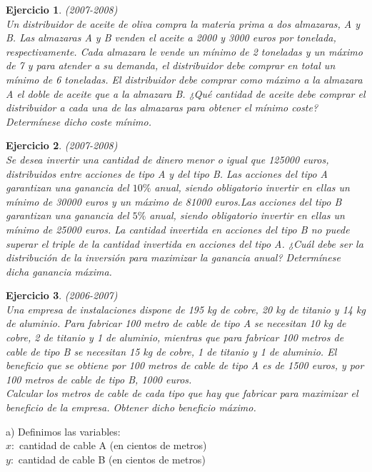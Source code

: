 \documentclass[12pt, a4paper]{amsart}
\newtheorem{ejer}{Ejercicio}
\newcommand{\s}{\color[rgb]{0,0,0.5}}
\begin{document}
\begin{ejer}\em  (2007-2008)\\
Un distribuidor de aceite de oliva compra la materia prima a dos almazaras, A y B. Las almazaras A y B venden el aceite a 2000 y 3000 euros por tonelada, respectivamente. Cada almazara le vende un mínimo de 2 toneladas y un máximo de 7 y para atender a su demanda, el distribuidor debe comprar en total un mínimo de 6 toneladas. El distribuidor debe comprar como máximo a la almazara A el doble de aceite que a la almazara B. ¿Qué cantidad de aceite debe comprar el distribuidor a cada una de las almazaras para obtener el mínimo coste? Determínese dicho coste mínimo.
\end{ejer}

\begin{ejer}\em  (2007-2008)\\
Se desea invertir una cantidad de dinero menor o igual que 125000 euros, distribuidos entre acciones de tipo A y del tipo B. Las acciones del tipo A garantizan una ganancia del $10\%$ anual, siendo obligatorio invertir en ellas un mínimo de 30000 euros y un máximo de 81000 euros.Las acciones del tipo B garantizan una ganancia del $5\%$ anual, siendo obligatorio invertir en ellas un mínimo de 25000 euros. La cantidad invertida en acciones del tipo B no puede superar el triple de la cantidad invertida en acciones del tipo A. ¿Cuál debe ser la distribución de la inversión para maximizar la ganancia anual? Determínese dicha ganancia máxima.
\end{ejer}


\begin{ejer}\em  (2006-2007)\\
Una empresa de instalaciones dispone de 195 kg de cobre, 20 kg de titanio y 14 kg de aluminio. Para fabricar 100 metro de cable de tipo A se necesitan 10 kg de cobre, 2 de titanio y 1 de aluminio, mientras que para fabricar 100 metros de cable de tipo B se necesitan 15 kg de cobre, 1 de titanio y 1 de aluminio. El beneficio que se obtiene por 100 metros de cable de tipo A es de 1500 euros, y por 100 metros de cable de tipo B, 1000 euros.\\
Calcular los metros de cable de cada tipo que hay que fabricar para maximizar el beneficio de la empresa. Obtener dicho beneficio máximo.
\end{ejer}
\s

\hspace*{-4mm} a) Definimos las variables:\\
$x:$ cantidad de cable A (en cientos de metros)\\
$y:$ cantidad de cable B (en cientos de metros)
\end{document}
